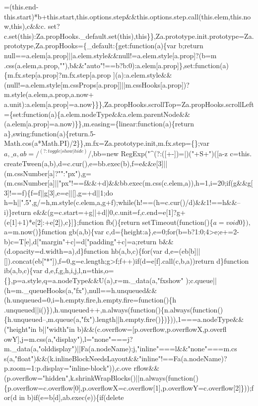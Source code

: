 \begin{DoxyCode}
{      =(this.end-this.start)*b+this.start,this.options.step&&this.options.step.call(this.elem,this.now,this),c&&c.
      set?c.set(this):Za.propHooks.\_default.set(this),this\}\},Za.prototype.init.prototype=Za.prototype,Za.propHooks=\{\_default:\{get:function(a)\{var b;return
       null==a.elem[a.prop]||a.elem.style&&null!=a.elem.style[a.prop]?(b=m
      .css(a.elem,a.prop,""),b&&"auto"!==b?b:0):a.elem[a.prop]\},set:function(a)\{m.fx.step[a.prop]?m.fx.step[a.prop
      ](a):a.elem.style&&(null!=a.elem.style[m.cssProps[a.prop]]||m.cssHooks[a.prop])?m.style(a.elem,a.prop,a.now+
      a.unit):a.elem[a.prop]=a.now\}\}\},Za.propHooks.scrollTop=Za.propHooks.scrollLeft=\{set:function(a)\{a.elem.nodeType&&a.elem.parentNode&&(a.elem[a.prop]=a.now)\}\},m.easing=\{linear:function(a)\{return
       a\},swing:function(a)\{return.5-Math.cos(a*Math.PI)/2\}\},m.fx=Za.prototype.init,m.fx.step=\{\};var
       $a,\_a,ab=/^(?:toggle|show|hide)$/,bb=new RegExp("^(?:([+-])=|)("+S+")([a-z%
       c=this.
      createTween(a,b),d=c.cur(),e=bb.exec(b),f=e&&e[3]||(m.cssNumber[a]?"":"px"),g=(m.cssNumber[a]||"px"!==f&&+d)&&bb.exec(m.css(c.elem,a)),h=1,i=20;if(g&&g[3]!==f)\{f=f||g[3],e=e||[],g=+d||1;do
       h=h||".5",g/=h,m.style(c.elem,a,g+f);while(h!==(h=c.cur()/d)&&1!==h&&--i)\}return
       e&&(g=c.start=+g||+d||0,c.unit=f,c.end=e[1]?g+(e[1]+1)*e[2]:+e[2]),c\}]\};function fb()\{return setTimeout(function()\{$a=void 0\}),$a=m.now()\}function gb(a,b)\{var
       c,d=\{height:a\},e=0;for(b=b?1:0;4>e;e+=2-b)c=T[e],d["margin"+c]=d["padding"+c]=a;return
       b&&(d.opacity=d.width=a),d\}function hb(a,b,c)\{for(var
       d,e=(eb[b]||[]).concat(eb["*"]),f=0,g=e.length;g>f;f++)if(d=e[f].call(c,b,a))return d\}function ib(a,b,c)\{var
       d,e,f,g,h,i,j,l,n=this,o=\{\},p=a.style,q=a.nodeType&&U(a),r=m.\_data(a,"fxshow"
      );c.queue||(h=m.\_queueHooks(a,"fx"),null==h.unqueued&&(h.unqueued=0,i=h.empty.fire,h.empty.fire=function()\{h
      .unqueued||i()\}),h.unqueued++,n.always(function()\{n.always(function()\{h.unqueued--,m.queue(a,"fx").length||h.empty.fire()\})\})),1===a.nodeType&&("height"in b||"width"in
       b)&&(c.overflow=[p.overflow,p.overflowX,p.overfl
      owY],j=m.css(a,"display"),l="none"===j?m.\_data(a,"olddisplay")||Fa(a.nodeName):j,"inline"===l&&"none"===m.cs
      s(a,"float")&&(k.inlineBlockNeedsLayout&&"inline"!==Fa(a.nodeName)?p.zoom=1:p.display="inline-block")),c.ove
      rflow&&(p.overflow="hidden",k.shrinkWrapBlocks()||n.always(function()\{p.overflow=c.overflow[0],p.overflowX=c.overflow[1],p.overflowY=c.overflow[2]\}));for(d in b)if(e=b[d],ab.exec(e))\{if(delete
}
\end{DoxyCode}

